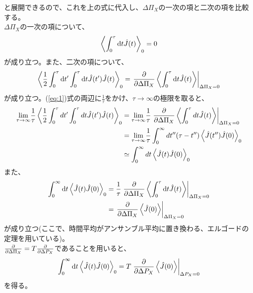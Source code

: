 \documentclass[a4paper,11pt]{jsarticle}
\begin{document}
    と展開できるので、これを上の式に代入し、$\Delta \Pi_X$の一次の項と二次の項を比較する。\\
    $\Delta \Pi_X$の一次の項について、
    \begin{align}
        \ev{\int_{0}^{\tau} \dd t \hat{J}(t)}_0 =0
    \end{align}
    が成り立つ。また、二次の項について、
    \begin{equation}
        \label{eq:1}
        \ev{\frac{1}{2}\int_{0}^{\tau} \dd t' \int_{0}^{\tau} \dd t \hat{J}(t')\hat{J}(t)}_0 = \left. \pdv{\Delta \Pi_X} \ev{\int_{0}^{\tau} \dd t \hat{J}(t)}\right|_{\Delta \Pi_X = 0}
    \end{equation}
が成り立つ。(\ref{eq:1})式の両辺に$\frac{1}{\tau}$をかけ、$\tau \to \infty$の極限を取ると、
\begin{align}
    \underset{\tau \to \infty}{\text{lim}} \frac{1}{\tau} \ev{\frac{1}{2}\int_{0}^{\tau} dt' \int_{0}^{\tau} dt \hat{J}(t')\hat{J}(t)}_0 
    &=\underset{\tau \to \infty}{\text{lim}} \frac{1}{\tau} \left.\pdv{\Delta \Pi_X} \ev{\int_{0}^{\tau} dt \hat{J}(t)}\right|_{\Delta \Pi_X = 0}\\
    &=\underset{\tau \to \infty}{\text{lim}} \frac{1}{\tau} \int_{0}^{\infty} dt''(\tau - t'')\ev{\hat{J}(t'')\hat{J}(0)}_0\\
    &\simeq \int_{0}^{\infty} dt \ev{\hat{J}(t)\hat{J}(0)}_0
\end{align}
また、
\begin{align}
    \int_{0}^{\infty} \dd t \ev{\hat{J}(t)\hat{J}(0)}_0 &= \frac{1}{\tau}\left.\pdv{\Delta \Pi_X} \ev{\int_{0}^{\tau} \dd t \hat{J}(t)}\right|_{\Delta \Pi_X = 0}\\
    &= \left.\pdv{\Delta \Pi_X} \ev{\hat{J}(0)}\right|_{\Delta \Pi_X = 0}
\end{align}
が成り立つ(ここで、時間平均がアンサンブル平均に置き換わる、エルゴードの定理を用いている)。\\
$\pdv{\Delta \Pi_X} =T\pdv{\Delta P_X}$であることを用いると、
\begin{equation}
    \int_{0}^{\infty} \dd t \ev{\hat{J}(t)\hat{J}(0)}_0 = T\left.\pdv{\Delta P_X} \ev{\hat{J}(0)}\right|_{\Delta P_X = 0}
\end{equation}
を得る。\hfill \qedsymbol
\end{document}
